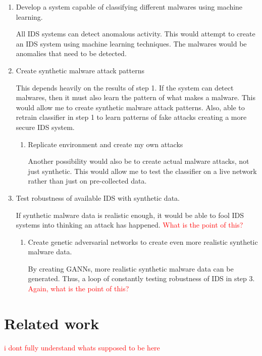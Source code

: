 \documentclass[11pt]{article}
\begin{document}
\begin{enumerate}
  \item Develop a system capable of classifying different malwares using machine learning. 
  
  All IDS systems can detect anomalous activity. This would attempt to create an IDS system using machine learning techniques. The malwares would be anomalies that need to be detected.

  \item Create synthetic malware attack patterns

  This depends heavily on the results of step 1. If the system can detect malwares, then it must also learn the pattern of what makes a malware. This would allow me to create synthetic malware   attack patterns. Also, able to retrain classifier in step 1 to learn patterns of fake attacks creating a more secure IDS system.

  \begin{enumerate}
    \item{Replicate environment and create my own attacks}

    Another possibility would also be to create actual malware attacks, not just synthetic. This would allow me to test the classifier on a live network rather than just on pre-collected data.
  \end{enumerate}  

  \item Test robustness of available IDS with synthetic data.

  If synthetic malware data is realistic enough, it would be able to fool IDS systems into thinking an attack has happened. \textcolor{red}{What is the point of this?}

  \begin{enumerate}
    \item{Create genetic adversarial networks to create even more realistic synthetic malware data.}

    By creating GANNs, more realistic synthetic malware data can be generated. Thus, a loop of constantly testing robustness of IDS in step 3. \textcolor{red}{Again, what is the point of this?}
  \end{enumerate}  
\end{enumerate}

\newpage
\section{Related work}
\textcolor{red}{i dont fully understand whats supposed to be here}
\end{document}
